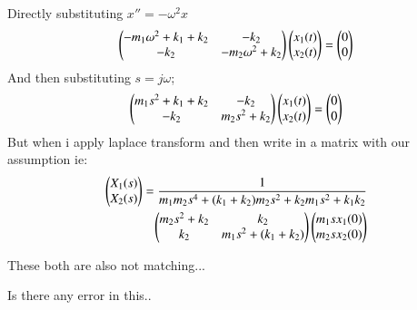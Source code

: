 \documentclass[journal,12pt,twocolumn]{IEEEtran}
\theoremstyle{remark}
\begin{document}
Directly substituting $x''=-\omega^2 x$
\begin{align}
\begin{pmatrix}
-m_1\omega^2+k_1+k_2 & -k_2  \\
-k_2  & -m_2\omega^2+ k_2
\end{pmatrix}
\begin{pmatrix}
x_1(t) \\
x_2(t)
\end{pmatrix}
=
\begin{pmatrix}
0 \\
0
\end{pmatrix}
\end{align}
And then substituting $s=j\omega$;
\begin{align}
\begin{pmatrix}
m_1s^2+k_1+k_2 & -k_2  \\
-k_2  & m_2s^2+ k_2
\end{pmatrix}
\begin{pmatrix}
x_1(t) \\
x_2(t)
\end{pmatrix}
=
\begin{pmatrix}
0 \\
0
\end{pmatrix}
\end{align}
But when i apply laplace transform and then write in a matrix with our assumption ie:
\begin{align}
\begin{pmatrix}
X_1(s) \\
X_2(s)
\end{pmatrix}
= \frac{1}{m_1m_2s^4+(k_1+k_2)m_2s^2+k_2m_1s^2+k_1k_2} \nonumber \\
\begin{pmatrix}
m_2s^2+k_2 & k_2  \\
k_2& m_1s^2+(k_1+k_2)
\end{pmatrix}
\begin{pmatrix}
m_1sx_1(0) \\
m_2sx_2(0)
\end{pmatrix}
\end{align}

These both are also  not matching...

Is there any error in this..
\end{document}
